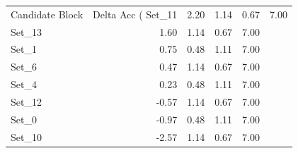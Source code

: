 \begin{tabular}{lrrrr}
\toprule
Candidate Block & Delta Acc (%
\midrule
Set_11 & 2.20 & 1.14 & 0.67 & 7.00 \\
Set_13 & 1.60 & 1.14 & 0.67 & 7.00 \\
Set_1 & 0.75 & 0.48 & 1.11 & 7.00 \\
Set_6 & 0.47 & 1.14 & 0.67 & 7.00 \\
Set_4 & 0.23 & 0.48 & 1.11 & 7.00 \\
Set_12 & -0.57 & 1.14 & 0.67 & 7.00 \\
Set_0 & -0.97 & 0.48 & 1.11 & 7.00 \\
Set_10 & -2.57 & 1.14 & 0.67 & 7.00 \\
\bottomrule
\end{tabular}
